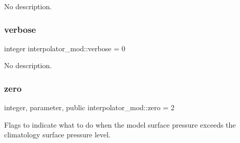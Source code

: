 No description. 

\mbox{\label{namespaceinterpolator__mod_a5d5367264c6c0ed9fee5860d5a4b7907}} 
\subsubsection{\texorpdfstring{verbose}{verbose}}
{\footnotesize\ttfamily integer interpolator\+\_\+mod\+::verbose = 0\hspace{0.3cm}{\ttfamily [private]}}



No description. 

\mbox{\label{namespaceinterpolator__mod_a4a4f1f5ef4024f3705d0560213d4e6fb}} 
\subsubsection{\texorpdfstring{zero}{zero}}
{\footnotesize\ttfamily integer, parameter, public interpolator\+\_\+mod\+::zero = 2}



Flags to indicate what to do when the model surface pressure exceeds the climatology surface pressure level. 

